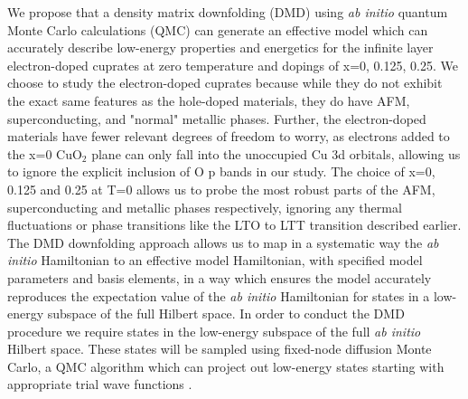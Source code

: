 \documentclass{article}
\begin{document}
We propose that a density matrix downfolding (DMD) \cite{10.3389/fphy.2018.00043, doi:10.1063/1.4927664} using \textit{ab initio} quantum Monte Carlo calculations (QMC) can generate an effective model which can accurately describe low-energy properties and energetics for the infinite layer electron-doped cuprates at zero temperature and dopings of x=0, 0.125, 0.25. 
We choose to study the electron-doped cuprates because while they do not exhibit the exact same features as the hole-doped materials, they do have AFM,  superconducting, and "normal" metallic phases. 
Further, the electron-doped materials have fewer relevant degrees of freedom to worry, as electrons added to the x=0 CuO$_2$ plane can only fall into the unoccupied Cu 3d orbitals, allowing us to ignore the explicit inclusion of O p bands in our study. 
The choice of x=0, 0.125 and 0.25 at T=0 allows us to probe the most robust parts of the AFM, superconducting and metallic phases respectively, ignoring any thermal fluctuations or phase transitions like the LTO to LTT transition described earlier. 
The DMD downfolding approach allows us to map in a systematic way the \textit{ab initio} Hamiltonian to an effective model Hamiltonian, with specified model parameters and basis elements, in a way which ensures the model accurately reproduces the expectation value of the \textit{ab initio} Hamiltonian for states in a low-energy subspace of the full Hilbert space. 
In order to conduct the DMD procedure we require states in the low-energy subspace of the full \textit{ab initio} Hilbert space. 
These states will be sampled using fixed-node diffusion Monte Carlo, a QMC algorithm which can project out low-energy states starting with appropriate trial wave functions \cite{RevModPhys.73.33}.
 
\end{document}
